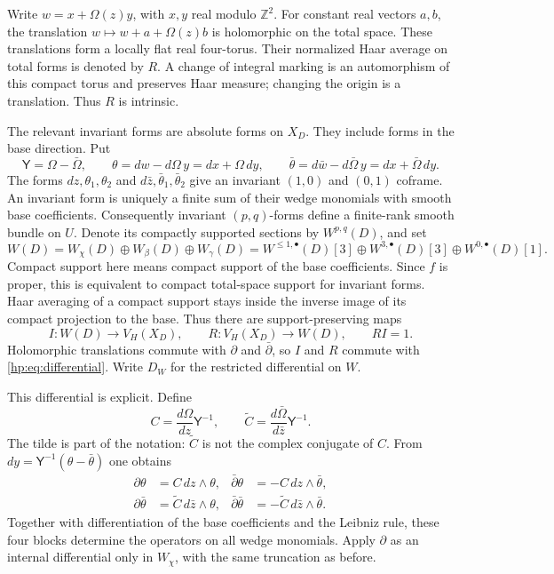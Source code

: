 Write $w=x+\Omega(z)y$, with $x,y$ real modulo $\mathbb Z^2$.
For constant real vectors $a,b$, the translation
$w\mapsto w+a+\Omega(z)b$ is holomorphic on the total space.
These translations form a locally flat real four-torus. Their
normalized Haar average on total forms is denoted by $R$.
A change of integral marking is an automorphism of this compact
torus and preserves Haar measure; changing the origin is a
translation. Thus $R$ is intrinsic.

The relevant invariant forms are absolute forms on $X_D$. They
include forms in the base direction. Put
\begin{equation}\label{hp:eq:coframe}
 \mathsf Y=\Omega-\bar\Omega,\qquad
 \theta=dw-d\Omega\,y=dx+\Omega\,dy,\qquad
 \bar\theta=d\bar w-d\bar\Omega\,y=dx+\bar\Omega\,dy.
\end{equation}
The forms $dz,\theta_1,\theta_2$ and
$d\bar z,\bar\theta_1,\bar\theta_2$ give an invariant
$(1,0)$ and $(0,1)$ coframe. An invariant form is uniquely a
finite sum of their wedge monomials with smooth base coefficients.
Consequently invariant $(p,q)$-forms define a finite-rank smooth
bundle on $U$. Denote its compactly supported sections by
$W^{p,q}(D)$, and set
\begin{equation}\label{hp:eq:finite-linear}
 W(D)=W_\chi(D)\oplus W_\beta(D)\oplus W_\gamma(D)
 =W^{\leq1,\bullet}(D)[3]\oplus W^{3,\bullet}(D)[3]
                              \oplus W^{0,\bullet}(D)[1].
\end{equation}
Compact support here means compact support of the base coefficients.
Since $f$ is proper, this is equivalent to compact total-space
support for invariant forms. Haar averaging of a compact support
stays inside the inverse image of its compact projection to the
base. Thus there are support-preserving maps
\begin{equation}\label{hp:eq:IR}
 I:W(D)\longrightarrow V_H(X_D),\qquad
 R:V_H(X_D)\longrightarrow W(D),\qquad RI=1.
\end{equation}
Holomorphic translations commute with $\partial$ and
$\bar\partial$, so $I$ and $R$ commute with
\eqref{hp:eq:differential}. Write $D_W$ for the restricted
differential on $W$.

This differential is explicit. Define
\[
 C=\frac{d\Omega}{dz}\mathsf Y^{-1},\qquad
 \widetilde C=\frac{d\bar\Omega}{d\bar z}\mathsf Y^{-1}.
\]
The tilde is part of the notation: $\widetilde C$ is not the
complex conjugate of $C$. From
$dy=\mathsf Y^{-1}(\theta-\bar\theta)$ one obtains
\begin{equation}\label{hp:eq:four-blocks}
\begin{aligned}
 \partial\theta&=C\,dz\wedge\theta,&
 \bar\partial\theta&=-C\,dz\wedge\bar\theta,\\
 \partial\bar\theta&=\widetilde C\,d\bar z\wedge\theta,&
 \bar\partial\bar\theta&=-\widetilde C\,d\bar z\wedge\bar\theta.
\end{aligned}
\end{equation}
Together with differentiation of the base coefficients and the
Leibniz rule, these four blocks determine the operators on all
wedge monomials. Apply $\partial$ as an internal differential only
in $W_\chi$, with the same truncation as before.


